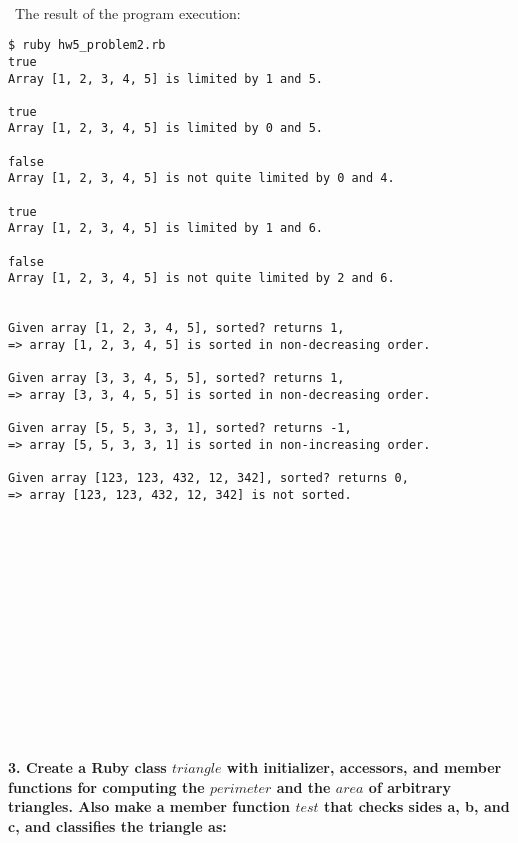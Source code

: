 \documentclass{article}
\begin{document}
\paragraph{}\
	The result of the program execution:
	
\begin{verbatim} 
$ ruby hw5_problem2.rb
true
Array [1, 2, 3, 4, 5] is limited by 1 and 5.

true
Array [1, 2, 3, 4, 5] is limited by 0 and 5.

false
Array [1, 2, 3, 4, 5] is not quite limited by 0 and 4.

true
Array [1, 2, 3, 4, 5] is limited by 1 and 6.

false
Array [1, 2, 3, 4, 5] is not quite limited by 2 and 6.


Given array [1, 2, 3, 4, 5], sorted? returns 1,
=> array [1, 2, 3, 4, 5] is sorted in non-decreasing order.

Given array [3, 3, 4, 5, 5], sorted? returns 1,
=> array [3, 3, 4, 5, 5] is sorted in non-decreasing order.

Given array [5, 5, 3, 3, 1], sorted? returns -1,
=> array [5, 5, 3, 3, 1] is sorted in non-increasing order.

Given array [123, 123, 432, 12, 342], sorted? returns 0,
=> array [123, 123, 432, 12, 342] is not sorted.
\end{verbatim}
	
\paragraph{}\
\paragraph{}\
\paragraph{}\
\paragraph{}\
\paragraph{}\
\paragraph{}\

\paragraph{3. Create a Ruby class \(triangle\) with initializer, accessors, and member functions for computing the \(perimeter\) and the \(area\) of arbitrary triangles. Also make a member function \(test\) that checks sides a, b, and c, and classifies the triangle as: }\
\end{document}

